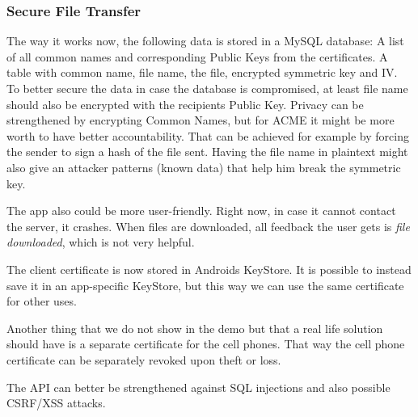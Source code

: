 \subsubsection*{Secure File Transfer}

The way it works now, the following data is stored in a MySQL database: A list of all common names and corresponding Public Keys from the certificates. A table with common name, file name, the file, encrypted symmetric key and IV. To better secure the data in case the database is compromised, at least file name should also be encrypted with the recipients Public Key. Privacy can be strengthened by encrypting Common Names, but for ACME it might be more worth to have better accountability. That can be achieved for example by forcing the sender to sign a hash of the file sent. Having the file name in plaintext might also give an attacker patterns (known data) that help him break the symmetric key.

The app also could be more user-friendly. Right now, in case it cannot contact the server, it crashes. When files are downloaded, all feedback the user gets is \emph{file downloaded}, which is not very helpful. 

The client certificate is now stored in Androids KeyStore. It is possible to instead save it in an app-specific KeyStore, but this way we can use the same certificate for other uses.

Another thing that we do not show in the demo but that a real life solution should have is a separate certificate for the cell phones. That way the cell phone certificate can be separately revoked upon theft or loss.

The API can better be strengthened against SQL injections and also possible CSRF/XSS attacks.